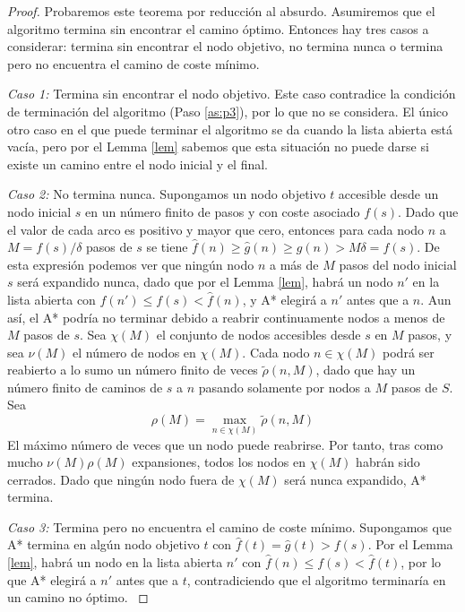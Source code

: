 \documentclass[a4paper,12pt]{article}
\newenvironment{case1}{\textit{Caso 1:}}{}
\newenvironment{case2}{\textit{Caso 2:}}{}
\newenvironment{case3}{\textit{Caso 3:}}{}
\begin{document}
\begin{proof}
Probaremos este teorema por reducción al absurdo. Asumiremos que el algoritmo termina sin encontrar el camino óptimo. Entonces hay tres casos a considerar: termina sin encontrar el nodo objetivo, no termina nunca o termina pero no encuentra el camino de coste mínimo.

\begin{case1}
    Termina sin encontrar el nodo objetivo. Este caso contradice la condición de terminación del algoritmo (Paso \ref{as:p3}), por lo que no se considera. El único otro caso en el que puede terminar el algoritmo se da cuando la lista abierta está vacía, pero por el Lemma \ref{lem} sabemos que esta situación no puede darse si existe un camino entre el nodo inicial y el final.
\end{case1}

\begin{case2}
    No termina nunca. Supongamos un nodo objetivo $t$ accesible desde un nodo inicial $s$ en un número finito de pasos y con coste asociado $f(s)$. Dado que el valor de cada arco es positivo y mayor que cero, entonces para cada nodo $n$ a $M=f(s)/\delta$ pasos de $s$ se tiene $\hat{f}(n) \geq \hat{g}(n) \geq g(n) > M\delta = f(s)$. De esta expresión podemos ver que ningún nodo $n$ a más de $M$ pasos del nodo inicial $s$ será expandido nunca, dado que por el Lemma \ref{lem}, habrá un nodo $n'$ en la lista abierta con $\hat{f}(n') \leq f(s) < \hat{f}(n)$, y A* elegirá a $n'$ antes que a $n$. Aun así, el A* podría no terminar debido a reabrir continuamente nodos a menos de $M$ pasos de $s$. Sea $\chi(M)$ el conjunto de nodos accesibles desde $s$ en $M$ pasos, y sea $\nu(M)$ el número de nodos en $\chi(M)$. Cada nodo $n\in\chi(M)$ podrá ser reabierto a lo sumo un número finito de veces $\tilde{\rho}(n, M)$, dado que hay un número finito de caminos de $s$ a $n$ pasando solamente por nodos a $M$ pasos de $S$. Sea
    $$\rho(M) = \max_{n\in\chi(M)}\tilde{\rho}(n, M)$$
    El máximo número de veces que un nodo puede reabrirse. Por tanto, tras como mucho $\nu(M)\rho(M)$ expansiones, todos los nodos en $\chi(M)$ habrán sido cerrados. Dado que ningún nodo fuera de $\chi(M)$ será nunca expandido, A* termina.
\end{case2}

\begin{case3}
    Termina pero no encuentra el camino de coste mínimo. Supongamos que A* termina en algún nodo objetivo $t$ con $\hat{f}(t)=\hat{g}(t)> f(s)$. Por el Lemma \ref{lem}, habrá un nodo en la lista abierta $n'$ con $\hat{f}(n) \leq f(s) < \hat{f}(t)$, por lo que A* elegirá a $n'$ antes que a $t$, contradiciendo que el algoritmo terminaría en un camino no óptimo.
\end{case3}

\end{proof}
\end{document}

